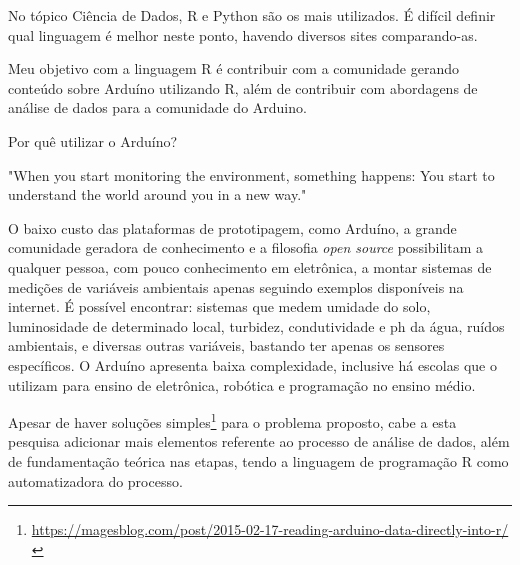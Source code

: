 No tópico Ciência de Dados, R e Python são os mais utilizados. É difícil definir 
qual linguagem é melhor neste ponto, havendo diversos sites comparando-as.

Meu objetivo com a linguagem R é contribuir com a 
comunidade gerando conteúdo sobre Arduíno utilizando R, além de contribuir com 
abordagens de análise de dados para a comunidade do Arduino.

Por quê utilizar o Arduíno? 
\begin{citacao}[english]
  "When you start monitoring the environment,
  something happens: You start to understand the world around you in a new way." \cite{Gertz2012}
\end{citacao}

O baixo custo das plataformas de prototipagem, como Arduíno, a 
grande comunidade geradora de conhecimento e a filosofia \emph{open source}
possibilitam a qualquer pessoa, com pouco conhecimento em eletrônica, a
montar sistemas de medições de variáveis ambientais apenas seguindo exemplos 
disponíveis na internet. É possível encontrar: sistemas que medem umidade do 
solo, luminosidade de determinado local, turbidez, condutividade e ph da água, ruídos 
ambientais, e diversas outras variáveis, bastando ter apenas os sensores 
específicos. O Arduíno apresenta baixa complexidade, inclusive há escolas que o utilizam 
para ensino de eletrônica, robótica e programação no ensino médio.
 
Apesar de haver soluções simples\footnote{\url{https://magesblog.com/post/2015-02-17-reading-arduino-data-directly-into-r/}}
para o problema proposto, cabe a esta pesquisa adicionar mais elementos 
referente ao processo de análise de dados, além de fundamentação teórica nas 
etapas, tendo a linguagem de programação R como automatizadora do processo.